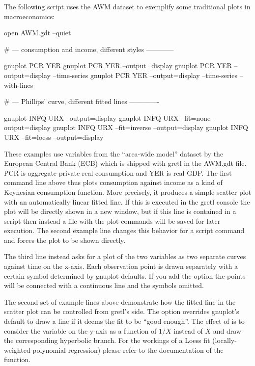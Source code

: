 The following script uses the AWM dataset to exemplify some
traditional plots in macroeconomics:

\begin{scode}
open AWM.gdt --quiet

# --- consumption and income, different styles ------------

gnuplot PCR YER
gnuplot PCR YER --output=display
gnuplot PCR YER --output=display --time-series
gnuplot PCR YER --output=display --time-series --with-lines

# --- Phillips' curve, different fitted lines -------------

gnuplot INFQ URX --output=display
gnuplot INFQ URX --fit=none --output=display
gnuplot INFQ URX --fit=inverse --output=display
gnuplot INFQ URX --fit=loess --output=display
\end{scode}

These examples use variables from the ``area-wide model'' dataset by the 
European Central Bank (ECB) which is shipped with gretl in the AWM.gdt file.
PCR is aggregate private real consumption and YER is real GDP. The first command 
line above thus plots consumption against income as a kind of Keynesian 
consumption function. More precisely, it produces a simple scatter plot with
an automatically linear fitted line. If this is executed in the gretl console
the plot will be directly shown in a new window, but if this line is contained
in a script then instead a file with the plot commands will be saved for later
execution. The second example line changes this behavior for a script command
and forces the plot to be shown directly. 

The third line instead asks for a plot of the two variables as two separate
curves against time on the x-axis. Each observation point is drawn separately
with a certain symbol determined by gnuplot defaults. If you add the option
 the points will be connected with a continuous line and the
symbols omitted.

The second set of example lines above demonstrate how the fitted line in the 
scatter plot can be controlled from gretl's side. The option 
overrides gnuplot's default to draw a line if it deems the fit to be ``good
enough''. The effect of  is to consider the variable on the
y-axis as a function of $1/X$ instead of $X$ and draw the corresponding
hyperbolic branch. For the workings of a Loess fit (locally-weighted polynomial 
regression) please refer to the documentation of the  function.

